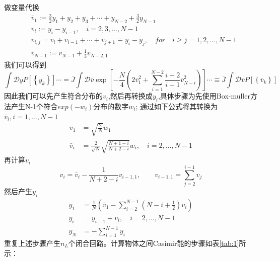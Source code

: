 做变量代换
\begin{equation*}
\begin{split}
&\bar{v}_{1} :=\frac{3}{2} y_{1}+y_{2}+y_{3}+\cdots+y_{N-2}+\frac{3}{2} y_{N-1} \\ 
&v_{i} :=y_{i}-y_{i-1},\quad i=2,3,\ldots,N-1 \\
&v_{i,j} =v_{i}+v_{i-1}+\cdots+v_{j+1} \equiv y_{i}-y_{j},\quad for \quad i \geq j=1,2,\ldots,N-1 \\
&\bar{v}_{N-1}:=v_{N-1}+\frac{1}{3} v_{N-2,1}
\end{split}
\end{equation*}
我们可以得到
$$
\int \mathcal{D} y P\left[\left\{y_{k}\right\}\right] \cdots=\bar{J} \int \mathcal{D} \bar{v} \exp \left[-\frac{N}{4}\left(2 \bar{v}_{1}^{2}+\sum_{i=1}^{N-2} \frac{i+2}{i+1} \bar{v}_{N-i}^{2}\right)\right] \cdots \equiv \bar{J} \int \mathcal{D} \bar{v} P\left[\left\{\bar{v}_{k}\right\}\right]
$$
因此我们可以先产生符合分布的$v_i$,然后再转换成$y_i$,具体步骤为先使用Box-muller方法产生N-1个符合$exp(-w_i)$分布的数字$w_i$;
通过如下公式将其转换为$\bar{v}_{i},i=1,\ldots,N-1$
$$
\begin{aligned} \bar{v}_{1} &=\sqrt{\frac{2}{N}} w_{1} \\ \bar{v}_{i} &=\frac{2}{\sqrt{N}} \sqrt{\frac{N+1-i}{N+2-i}} w_{i},\quad i=2,\ldots,N-1 \end{aligned}
$$
再计算$v_i$
$$
v_{i}=\bar{v}_{i}-\frac{1}{N+2-i} v_{i-1,1},\quad \quad v_{i-1,1}=\sum_{j=2}^{i-1} v_{j}
$$
然后产生$y_i$
$$
\begin{aligned} y_{1} &=\frac{1}{N}\left(\bar{v}_{1}-\sum_{i=2}^{N-1}\left(N-i+\frac{1}{2}\right) v_{i}\right) \\ y_{i} &=y_{i-1}+v_{i},\quad i=2,\ldots,N-1 \\ y_{N} &=-\sum_{i=1}^{N-1} y_{i} \end{aligned}
$$
重复上述步骤产生$n_L$个闭合回路。计算物体之间Casimir能的步骤如表\ref{tab:1}所示：
\begin{table}[h]
	\centering
	\caption{使用世界线方法计算Casimir能的步骤}
	\label{tab:1}
\end{table}
